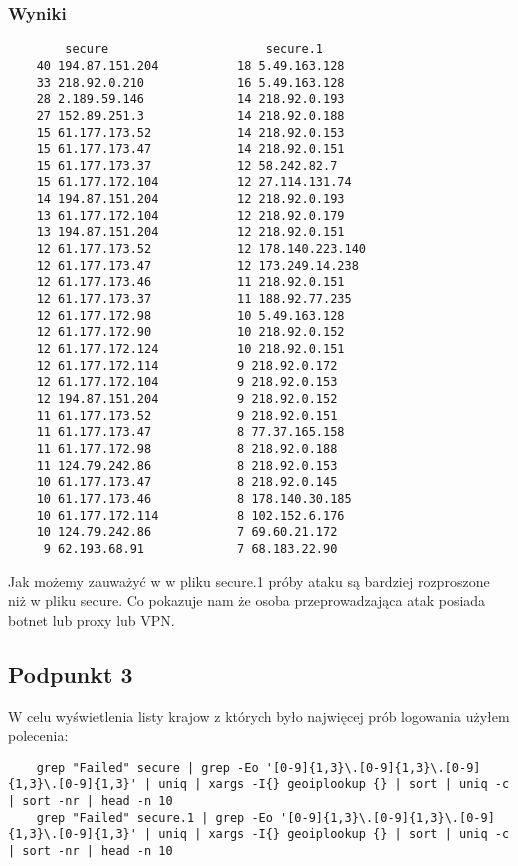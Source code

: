 \documentclass{article}
\begin{document}
\subsubsection{Wyniki}
\begin{verbatim}
        secure                      secure.1
    40 194.87.151.204           18 5.49.163.128   
    33 218.92.0.210             16 5.49.163.128
    28 2.189.59.146             14 218.92.0.193
    27 152.89.251.3             14 218.92.0.188
    15 61.177.173.52            14 218.92.0.153
    15 61.177.173.47            14 218.92.0.151
    15 61.177.173.37            12 58.242.82.7
    15 61.177.172.104           12 27.114.131.74
    14 194.87.151.204           12 218.92.0.193
    13 61.177.172.104           12 218.92.0.179
    13 194.87.151.204           12 218.92.0.151
    12 61.177.173.52            12 178.140.223.140
    12 61.177.173.47            12 173.249.14.238
    12 61.177.173.46            11 218.92.0.151
    12 61.177.173.37            11 188.92.77.235
    12 61.177.172.98            10 5.49.163.128
    12 61.177.172.90            10 218.92.0.152
    12 61.177.172.124           10 218.92.0.151
    12 61.177.172.114           9 218.92.0.172
    12 61.177.172.104           9 218.92.0.153
    12 194.87.151.204           9 218.92.0.152
    11 61.177.173.52            9 218.92.0.151
    11 61.177.173.47            8 77.37.165.158
    11 61.177.172.98            8 218.92.0.188
    11 124.79.242.86            8 218.92.0.153
    10 61.177.173.47            8 218.92.0.145
    10 61.177.173.46            8 178.140.30.185  
    10 61.177.172.114           8 102.152.6.176
    10 124.79.242.86            7 69.60.21.172
     9 62.193.68.91             7 68.183.22.90
\end{verbatim}
Jak możemy zauważyć w w pliku secure.1 próby ataku są bardziej rozproszone niż w pliku secure. Co pokazuje nam że osoba przeprowadzająca atak posiada botnet lub proxy lub VPN.
\subsection{Podpunkt 3}
W celu wyświetlenia listy krajow z których było najwięcej prób logowania użyłem polecenia:
\begin{verbatim}
    grep "Failed" secure | grep -Eo '[0-9]{1,3}\.[0-9]{1,3}\.[0-9]{1,3}\.[0-9]{1,3}' | uniq | xargs -I{} geoiplookup {} | sort | uniq -c | sort -nr | head -n 10
    grep "Failed" secure.1 | grep -Eo '[0-9]{1,3}\.[0-9]{1,3}\.[0-9]{1,3}\.[0-9]{1,3}' | uniq | xargs -I{} geoiplookup {} | sort | uniq -c | sort -nr | head -n 10
\end{verbatim}
\end{document}
